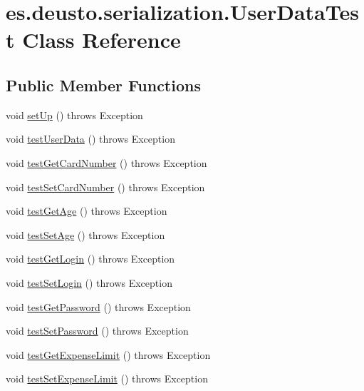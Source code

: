 \hypertarget{classes_1_1deusto_1_1serialization_1_1_user_data_test}{}\section{es.\+deusto.\+serialization.\+User\+Data\+Test Class Reference}
\label{classes_1_1deusto_1_1serialization_1_1_user_data_test}
\subsection*{Public Member Functions}
\begin{DoxyCompactItemize}
\item 
void \hyperlink{classes_1_1deusto_1_1serialization_1_1_user_data_test_a516d13b55d42b812fec8228334afbcaf}{set\+Up} ()  throws Exception 
\item 
void \hyperlink{classes_1_1deusto_1_1serialization_1_1_user_data_test_ac1b9100261a66d06a4c8bf4f80e859ba}{test\+User\+Data} ()  throws Exception 
\item 
void \hyperlink{classes_1_1deusto_1_1serialization_1_1_user_data_test_ae66eef68b1682794e0433b331e6ccff5}{test\+Get\+Card\+Number} ()  throws Exception 
\item 
void \hyperlink{classes_1_1deusto_1_1serialization_1_1_user_data_test_a4f08dcab38f34ee37a4417e6c3e3e8e8}{test\+Set\+Card\+Number} ()  throws Exception 
\item 
void \hyperlink{classes_1_1deusto_1_1serialization_1_1_user_data_test_a28ec7d8b20979ac4728275517ffb44f2}{test\+Get\+Age} ()  throws Exception 
\item 
void \hyperlink{classes_1_1deusto_1_1serialization_1_1_user_data_test_aa3241903064474a486744a64fbcd9c13}{test\+Set\+Age} ()  throws Exception 
\item 
void \hyperlink{classes_1_1deusto_1_1serialization_1_1_user_data_test_a7bee65127b733f7cd3e57839fda83723}{test\+Get\+Login} ()  throws Exception 
\item 
void \hyperlink{classes_1_1deusto_1_1serialization_1_1_user_data_test_a3311a4ff455e3d78280ec5da51a01998}{test\+Set\+Login} ()  throws Exception 
\item 
void \hyperlink{classes_1_1deusto_1_1serialization_1_1_user_data_test_a7219ec968af5364963f2868497d8a6af}{test\+Get\+Password} ()  throws Exception 
\item 
void \hyperlink{classes_1_1deusto_1_1serialization_1_1_user_data_test_aad240f31ab64b02d0121e4e594185767}{test\+Set\+Password} ()  throws Exception 
\item 
void \hyperlink{classes_1_1deusto_1_1serialization_1_1_user_data_test_ab89ad0d38dbae7e956619e6543586122}{test\+Get\+Expense\+Limit} ()  throws Exception 
\item 
void \hyperlink{classes_1_1deusto_1_1serialization_1_1_user_data_test_ac7e111d2323a6970210cfa086b2eedff}{test\+Set\+Expense\+Limit} ()  throws Exception 
\end{DoxyCompactItemize}


